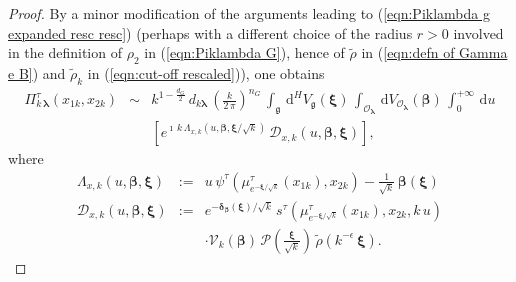 \documentclass[12pt,a4paper]{article}
\theoremstyle{plain}
\theoremstyle{definition}
\begin{document}
\begin{proof}
By a minor modification of the arguments leading to (\ref{eqn:Piklambda g expanded resc resc}) (perhaps with a
different choice of the radius $r>0$ involved in the
definition of
$\rho_2$ in (\ref{eqn:Piklambda G}), hence of
$\tilde{\rho}$ in (\ref{eqn:defn of Gamma e B}) and
 $\tilde{\rho}_k$ in (\ref{eqn:cut-off rescaled})),
one obtains
\begin{eqnarray}
\label{eqn:Piklambda g expanded resc resc 12}
\Pi^\tau_{k\,\boldsymbol{\lambda}}(x_{1k},x_{2k})&\sim&
%
k^{1-\frac{d_G}{2}}\,d_{k\boldsymbol{\lambda}}\,\left(\frac{k}{2\,\pi}\right)^{n_G}\,
\int_{\mathfrak{g}}\,
\mathrm{d}^HV_{\mathfrak{g}}(\boldsymbol{\xi})\,\int_{\mathcal{O}_{\boldsymbol{\lambda}}}\,
\mathrm{d}
V_{\mathcal{O}_{\boldsymbol{\lambda}}}(\boldsymbol{\beta})
\,\int_0^{+\infty}\,\mathrm{d}u
\nonumber
\\
&&\left[
 e^{\imath\,k\,\Lambda _{x,k}(u,\boldsymbol{\beta},\boldsymbol{\xi}/\sqrt{k})
}\,\mathcal{D}_{x,k}\left(u,\boldsymbol{\beta},\boldsymbol{\xi}\right)\right],
\end{eqnarray}
where 
\begin{eqnarray}
\label{eqn:LambdacalD}
\Lambda_{x,k}\left(u,\boldsymbol{\beta},
\boldsymbol{\xi}\right)
&:=&
u\,\psi^\tau\left(\mu^\tau_{e^{-\boldsymbol{\xi}/\sqrt{k}}}(x_{1k}),x_{2k}   \right)-
\frac{1}{\sqrt{k}}\,\boldsymbol{\beta}(\boldsymbol{\xi})\\
\mathcal{D}_{x,k}\left(u,\boldsymbol{\beta},\boldsymbol{\xi}\right)&:=&e^{-
\boldsymbol{\delta}_{\boldsymbol{\beta}}(\boldsymbol{\xi})/\sqrt{k}}
\,
s^\tau\left(\mu^\tau_{e^{-\boldsymbol{\xi}/\sqrt{k}}}(x_{1k}),
x_{2k}  ,k\,u\right)\nonumber\\
&&\cdot\mathcal{V}_k(\boldsymbol{\beta})\,
\mathcal{P}\left(\frac{\boldsymbol{\xi}}{\sqrt{k}}\right)
\,\tilde{\rho}\left(k^{-\epsilon}\,\boldsymbol{\xi}\right).
\nonumber
\end{eqnarray}


\end{proof}
\end{document}

